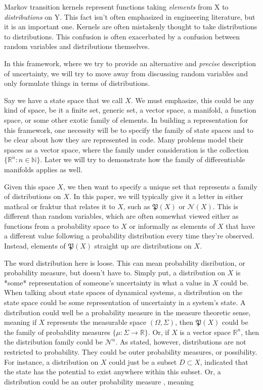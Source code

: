 \documentclass[letterpaper, 10 pt, conference]{ieeeconf}  %
\begin{document}
Markov transition kernels represent functions taking \emph{elements} from X to \emph{distributions} on Y.
This fact isn't often emphasized in engineering literature, but it is an important one.
Kernels are often mistakenly thought to take distributions to distributions.
This confusion is often exacerbated by a confusion between random variables and distributions themselves.

In this framework, where we try to provide an alternative and \emph{precise} description of uncertainty, we will try to move away from discussing random variables and only formulate things in terms of distributions.

\newcommand{\reals}{\mathds{R}}
\newcommand{\naturals}{\mathds{N}}
\newcommand{\gauss}{\mathcal{N}}
\newcommand{\prob}{\mathfrak{P}}

Say we have a state space that we call $X$.
We must emphasize, this could be any kind of space, be it a finite set, generic set, a vector space, a manifold, a function space, or some other exotic family of elements.
In building a representation for this framework, one necessity will be to specify the family of state spaces and to be clear about how they are represented in code.
Many problems model their spaces as a vector space, where the family under consideration is the collection $\{\reals^n:n\in \naturals\}$. 
Later we will try to demonstrate how the family of differentiable manifolds applies as well.

Given this space $X$, we then want to specify a unique set that represents a family of distributions on $X$.
In this paper, we will typically give it a letter in either mathcal or fraktur that relates it to $X$, such as $\prob(X)$ or $\gauss(X)$.
This is different than random variables, which are often somewhat viewed either as functions from a probability space to $X$ or informally as elements of $X$ that have a different value following a probability distribution every time they're observed.
Instead, elements of $\prob(X)$ straight up are distributions on $X$.

The word distribution here is loose.
This can mean probability disribution, or probability measure, but doesn't have to.
Simply put, a distribution on $X$ is *some* representation of someone's uncertainty in what a value in $X$ could be.
When talking about state spaces of dynamical systems, a distribution on the state space could be some representation of uncertainty in a system's state.
A distribution could well be a probability measure in the measure theoretic sense, meaning if $X$ represents the measurable space $(\Omega, \Sigma)$, then $\prob(X)$ could be the family of probability measures $\{\mu : \Sigma \rightarrow \reals\}$.
Or, if $X$ is a vector space $\reals^n$, then the distribution family could be $\gauss^n$.
As stated, however, distributions are not restricted to probability.
They could be outer probability measures, or possibility.
For instance, a distribution on $X$ could just be a subset $D\subset X$, indicated that the state has the potential to exist anywhere within this subset.
Or, a distribution could be an outer probability measure \cite{delande}, meaning 
\end{document}

